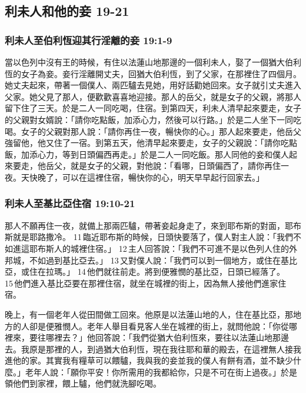     
\subsection{利未人和他的妾 19-21}
\subsubsection{利未人至伯利恆迎其行淫離的妾 19:1-9}
當以色列中沒有王的時候，有住以法蓮山地那邊的一個利未人，娶了一個猶大伯利恆的女子為妾。妾行淫離開丈夫，回猶大伯利恆，到了父家，在那裡住了四個月。她丈夫起來，帶著一個僕人、兩匹驢去見她，用好話勸她回來。女子就引丈夫進入父家。她父見了那人，便歡歡喜喜地迎接。那人的岳父，就是女子的父親，將那人留下住了三天。於是二人一同吃喝，住宿。到第四天，利未人清早起來要走，女子的父親對女婿說：「請你吃點飯，加添心力，然後可以行路。」於是二人坐下一同吃喝。女子的父親對那人說：「請你再住一夜，暢快你的心。」那人起來要走，他岳父強留他，他又住了一宿。到第五天，他清早起來要走，女子的父親說：「請你吃點飯，加添心力，等到日頭偏西再走。」於是二人一同吃飯。那人同他的妾和僕人起來要走，他岳父，就是女子的父親，對他說：「看哪，日頭偏西了，請你再住一夜。天快晚了，可以在這裡住宿，暢快你的心，明天早早起行回家去。」

\subsubsection{利未人至基比亞住宿 19:10-21}
那人不願再住一夜，就備上那兩匹驢，帶著妾起身走了，來到耶布斯的對面，耶布斯就是耶路撒冷。 11 臨近耶布斯的時候，日頭快要落了，僕人對主人說：「我們不如進這耶布斯人的城裡住宿。」 12 主人回答說：「我們不可進不是以色列人住的外邦城，不如過到基比亞去。」 13 又對僕人說：「我們可以到一個地方，或住在基比亞，或住在拉瑪。」 14 他們就往前走。將到便雅憫的基比亞，日頭已經落了。 15 他們進入基比亞要在那裡住宿，就坐在城裡的街上，因為無人接他們進家住宿。

晚上，有一個老年人從田間做工回來。他原是以法蓮山地的人，住在基比亞，那地方的人卻是便雅憫人。老年人舉目看見客人坐在城裡的街上，就問他說：「你從哪裡來，要往哪裡去？」他回答說：「我們從猶大伯利恆來，要往以法蓮山地那邊去。我原是那裡的人，到過猶大伯利恆，現在我往耶和華的殿去，在這裡無人接我進他的家。其實我有糧草可以餵驢，我與我的妾並我的僕人有餅有酒，並不缺少什麼。」老年人說：「願你平安！你所需用的我都給你，只是不可在街上過夜。」於是領他們到家裡，餵上驢，他們就洗腳吃喝。


